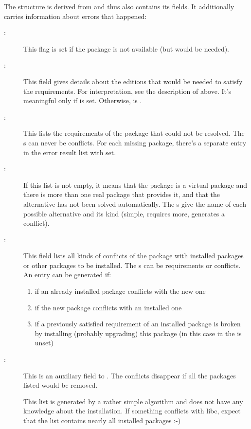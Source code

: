 \documentclass[10pt]{article}
\begin{document}
The  structure is derived from  and
thus also contains its fields. It additionally carries information
about errors that happened:
\begin{description}
\item[:]
  This flag is set if the package is not available (but would be needed).

\item[:]
  This field gives details about the editions that would be needed to
  satisfy the requirements. For interpretation, see the description of
   above. It's meaningful only if
   is set. Otherwise,
   is \true.

\item[:]
  This lists the requirements of the package that could not be
  resolved. The s can never be conflicts. For each
  missing package, there's a separate entry in the error result list
  with  set.

\item[:]
  If this list is not empty, it means that the package is a virtual
  package and there is more than one real package that provides it,
  and that the alternative has not been solved automatically. The
  s give the name of each possible alternative and
  its kind (simple, requires more, generates a conflict).

\item[:]
  This field lists all kinds of conflicts of the package with
  installed packages or other packages to be installed. The
  s can be requirements or conflicts. An entry can be
  generated if:
  \begin{enumerate}
  \item
    if an already installed package conflicts with the new one
  \item
    if the new package conflicts with an installed one
  \item
    if a previously satisfied requirement of an installed package is
    broken by installing (probably upgrading) this package (in this
    case  in the  is unset)
  \end{enumerate}

\item[:]
  This is an auxiliary field to . The conflicts
  disappear if all the packages listed would be removed.

  This list is generated by a rather simple algorithm and does not
  have any knowledge about the installation. If something conflicts
  with libc, expect that the list contains nearly all installed
  packages :-)

\end{description}
\end{document}
